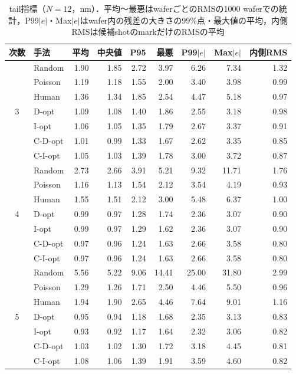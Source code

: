 \documentclass[10.5pt,a4paper]{ltjsarticle}
\begin{document}
\begin{table}[htbp]
  \centering
  \caption{tail指標（$N=12$，nm）．平均〜最悪はwaferごとのRMSの1000 waferでの統計，P99$|e|$・Max$|e|$はwafer内の残差の大きさの99\%点・最大値の平均，内側RMSは候補shotのmarkだけのRMSの平均}
  \label{tab:tail}
  \small
\begin{tabular}{clrrrrrrr}
\toprule
次数 & 手法 & 平均 & 中央値 & P95 & 最悪 & P99$|e|$ & Max$|e|$ & 内側RMS \\
\midrule
\multirow{7}{*}{3} & Random & 1.90 & 1.85 & 2.72 & 3.97 & 6.26 & 7.34 & 1.32 \\
 & Poisson & 1.19 & 1.18 & 1.55 & 2.00 & 3.40 & 3.98 & 0.99 \\
 & Human & 1.36 & 1.34 & 1.85 & 2.54 & 4.47 & 5.18 & 0.97 \\
 & D-opt & 1.09 & 1.08 & 1.40 & 1.86 & 2.55 & 3.18 & 0.98 \\
 & I-opt & 1.06 & 1.05 & 1.35 & 1.79 & 2.67 & 3.37 & 0.91 \\
 & C-D-opt & 1.01 & 0.99 & 1.33 & 1.67 & 2.62 & 3.35 & 0.85 \\
 & C-I-opt & 1.05 & 1.03 & 1.39 & 1.78 & 3.00 & 3.72 & 0.87 \\
\midrule
\multirow{7}{*}{4} & Random & 2.73 & 2.66 & 3.91 & 5.21 & 9.32 & 11.71 & 1.76 \\
 & Poisson & 1.16 & 1.13 & 1.54 & 2.12 & 3.54 & 4.19 & 0.93 \\
 & Human & 1.55 & 1.51 & 2.12 & 3.00 & 5.48 & 6.37 & 1.00 \\
 & D-opt & 0.99 & 0.97 & 1.28 & 1.74 & 2.36 & 3.07 & 0.90 \\
 & I-opt & 0.99 & 0.97 & 1.29 & 1.62 & 2.36 & 3.07 & 0.90 \\
 & C-D-opt & 0.97 & 0.96 & 1.24 & 1.63 & 2.66 & 3.58 & 0.80 \\
 & C-I-opt & 0.97 & 0.96 & 1.24 & 1.63 & 2.66 & 3.58 & 0.80 \\
\midrule
\multirow{7}{*}{5} & Random & 5.56 & 5.22 & 9.06 & 14.41 & 25.00 & 31.80 & 2.99 \\
 & Poisson & 1.29 & 1.26 & 1.71 & 2.50 & 4.46 & 5.50 & 0.96 \\
 & Human & 1.94 & 1.90 & 2.65 & 4.46 & 7.64 & 9.01 & 1.16 \\
 & D-opt & 0.95 & 0.94 & 1.18 & 1.68 & 2.35 & 3.13 & 0.83 \\
 & I-opt & 0.93 & 0.92 & 1.17 & 1.64 & 2.32 & 3.06 & 0.82 \\
 & C-D-opt & 1.03 & 1.02 & 1.30 & 1.72 & 3.18 & 4.45 & 0.81 \\
 & C-I-opt & 1.08 & 1.06 & 1.39 & 1.91 & 3.59 & 4.60 & 0.82 \\
\bottomrule
\end{tabular}
\end{table}
\end{document}
